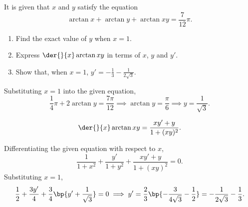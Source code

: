 \begin{problem}
    It is given that $x$ and $y$ satisfy the equation \[\arctan x + \arctan y  + \arctan{xy} = \frac7{12} \pi.\]

    \begin{enumerate}
        \item Find the exact value of $y$ when $x = 1$.
        \item Express $\der{}{x} \arctan{xy}$ in terms of $x$, $y$ and $y'$.
        \item Show that, when $x = 1$, $y' = -\frac13 - \frac1{2\sqrt3}$.
    \end{enumerate}
\end{problem}
\begin{solution}
    \begin{ppart}
        Substituting $x = 1$ into the given equation, \[\frac14 \pi + 2\arctan y = \frac{7\pi}{12} \implies \arctan y = \frac\pi6 \implies y = \frac1{\sqrt3}.\]
    \end{ppart}
    \begin{ppart}
        \[\der{}{x} \arctan{xy} = \frac{xy' + y}{1+(xy)^2}.\]
    \end{ppart}
    \begin{ppart}
        Differentiating the given equation with respect to $x$, \[\frac{1}{1+x^2} + \frac{y'}{1+y^2} + \frac{xy' + y}{1+(xy)^2} = 0.\] Substituting $x=1$, \[\frac12 + \frac{3y'}4 + \frac34\bp{y' + \frac1{\sqrt3}} = 0 \implies y' = \frac23 \bp{-\frac3{4\sqrt3} - \frac12} = -\frac1{2\sqrt3} - \frac13.\]
    \end{ppart}
\end{solution}

